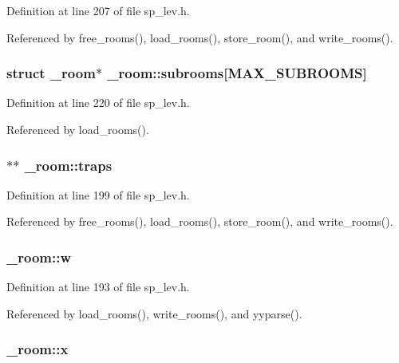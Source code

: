 Definition at line 207 of file sp\+\_\+lev.\+h.



Referenced by free\+\_\+rooms(), load\+\_\+rooms(), store\+\_\+room(), and write\+\_\+rooms().

\hypertarget{struct__room_a2c343f093ae49664a4fa89b4e3b97518}{
\subsubsection[{subrooms}]{\setlength{\rightskip}{0pt plus 5cm}struct {\bf \+\_\+room}$\ast$ \+\_\+room\+::subrooms\mbox{[}{\bf M\+A\+X\+\_\+\+S\+U\+B\+R\+O\+O\+M\+S}\mbox{]}}}\label{struct__room_a2c343f093ae49664a4fa89b4e3b97518}


Definition at line 220 of file sp\+\_\+lev.\+h.



Referenced by load\+\_\+rooms().

\hypertarget{struct__room_aead249557eb11c2d252993fc008c480c}{
\subsubsection[{traps}]{$\ast$$\ast$ \+\_\+room\+::traps}}\label{struct__room_aead249557eb11c2d252993fc008c480c}


Definition at line 199 of file sp\+\_\+lev.\+h.



Referenced by free\+\_\+rooms(), load\+\_\+rooms(), store\+\_\+room(), and write\+\_\+rooms().

\hypertarget{struct__room_a468bcdac94f7322f6ec4a0565e7e51d7}{
\subsubsection[{w}]{ \+\_\+room\+::w}}\label{struct__room_a468bcdac94f7322f6ec4a0565e7e51d7}


Definition at line 193 of file sp\+\_\+lev.\+h.



Referenced by load\+\_\+rooms(), write\+\_\+rooms(), and yyparse().

\hypertarget{struct__room_a7f3be8a31d75214a0e94c3bfb75d1fda}{
\subsubsection[{x}]{ \+\_\+room\+::x}}\label{struct__room_a7f3be8a31d75214a0e94c3bfb75d1fda}


